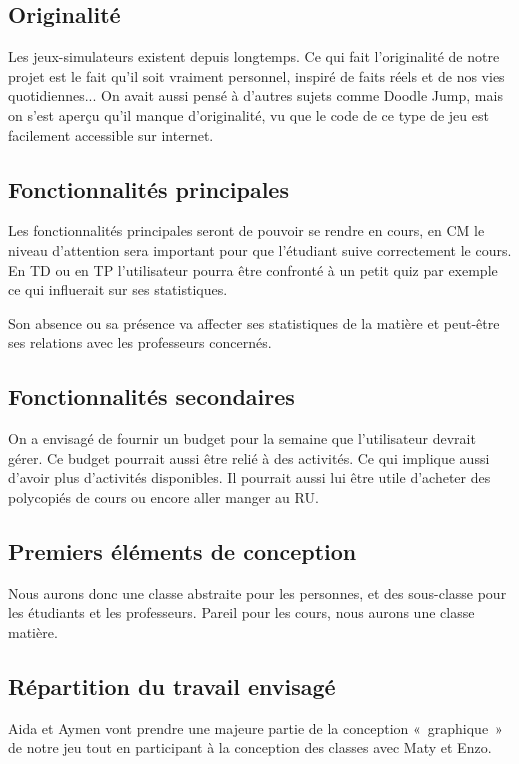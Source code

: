 \documentclass[12pt]{article}
\begin{document}
\subsection{Originalité}
\par{\vspace*{.5mm} Les jeux-simulateurs existent depuis longtemps. Ce qui fait l’originalité de notre projet est le fait qu’il soit vraiment personnel, inspiré de faits réels et de nos vies quotidiennes... 
On avait aussi pensé à d’autres sujets comme Doodle Jump, mais on s’est aperçu qu’il manque d’originalité, vu que le code de ce type de jeu est facilement accessible sur internet.}

\subsection{Fonctionnalités principales}
\par{\vspace*{.5mm} Les fonctionnalités principales seront de pouvoir se rendre en cours, en CM le niveau d’attention sera important pour que l’étudiant suive correctement le cours. En TD ou en TP l’utilisateur pourra être confronté à un petit quiz par exemple ce qui influerait sur ses statistiques.}

\par{\vspace*{.5mm} Son absence ou sa présence va affecter ses statistiques de la matière et peut-être ses relations avec les professeurs concernés.}

\subsection{Fonctionnalités secondaires}
\par{\vspace*{.5mm} On a envisagé de fournir un budget pour la semaine que l’utilisateur devrait gérer. Ce budget pourrait aussi être relié à des activités. Ce qui implique aussi d’avoir plus d’activités disponibles. Il pourrait aussi lui être utile d’acheter des polycopiés de cours ou encore aller manger au RU.}

\subsection{Premiers éléments de conception}
\par{\vspace*{.5mm} Nous aurons donc une classe abstraite pour les personnes, et des sous-classe pour les étudiants et les professeurs. Pareil pour les cours, nous aurons une classe matière. }

\subsection{Répartition du travail envisagé}
\par{\vspace*{.5mm} Aida et Aymen vont prendre une majeure partie de la conception « graphique » de notre jeu tout en participant à la conception des classes avec Maty et Enzo.}
\end{document}
